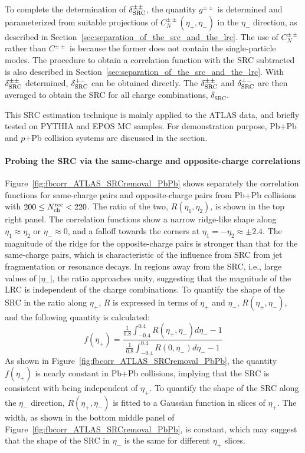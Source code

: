 To complete the determination of $\delta_\text{SRC}^{\pm\pm}$, the quantity $g^{\pm\pm}$ is determined and parameterized from suitable projections of $C_N^{\pm\pm}(\eta_+, \eta_-)$ in the $\eta_-$ direction, as described in Section~\ref{sec:separation_of_the_src_and_the_lrc}. The use of $C_N^{\pm\pm}$ rather than $C^{\pm\pm}$ is because the former does not contain the single-particle modes. The procedure to obtain a correlation function with the SRC subtracted is also described in Section~\ref{sec:separation_of_the_src_and_the_lrc}. With $\delta_\text{SRC}^{\pm\pm}$ determined, $\delta_\text{SRC}^{+-}$ can be obtained directly. The $\delta_\text{SRC}^{\pm\pm}$ and $\delta_\text{SRC}^{+-}$ are then averaged to obtain the SRC for all charge combinations, $\delta_\text{SRC}$.

This SRC estimation technique is mainly applied to the ATLAS data, and briefly tested on PYTHIA and EPOS MC samples. For demonstration purpose, Pb+Pb and $p$+Pb collision systems are discussed in the section.



\paragraph{Probing the SRC via the same-charge and opposite-charge correlations}
\label{sec:probing_the_src_via_the_same_charge_and_opposite_charge_correlations}

Figure~\ref{fig:fbcorr_ATLAS_SRCremoval_PbPb} shows separately the correlation functions for same-charge pairs and opposite-charge pairs from Pb+Pb collisions with $200 \le N_\text{ch}^\text{rec} < 220$. The ratio of the two, $R(\eta_1, \eta_2)$, is shown in the top right panel. The correlation functions show a narrow ridge-like shape along $\eta_1 \approx \eta_2$ or $\eta_- \approx 0$, and a falloff towards the corners at $\eta_1 = -\eta_2 \approx \pm 2.4$. The magnitude of the ridge for the opposite-charge pairs is stronger than that for the same-charge pairs, which is characteristic of the influence from SRC from jet fragmentation or resonance decays. In regions away from the SRC, i.e., large values of $|\eta_-|$, the ratio approaches unity, suggesting that the magnitude of the LRC is independent of the charge combinations. To quantify the shape of the SRC in the ratio along $\eta_+$, $R$ is expressed in terms of $\eta_+$ and $\eta_-$, $R(\eta_+, \eta_-)$, and the following quantity is calculated:
\begin{equation}
f(\eta_+) = \frac{\frac{1}{0.8} \int_{-0.4}^{0.4} R(\eta_+, \eta_-)d\eta_- - 1}{\frac{1}{0.8} \int_{-0.4}^{0.4} R(0, \eta_-)d\eta_- - 1}
\end{equation}
As shown in Figure~\ref{fig:fbcorr_ATLAS_SRCremoval_PbPb}, the quantity $f(\eta_+)$ is nearly constant in Pb+Pb collisions, implying that the SRC is consistent with being independent of $\eta_+$. To quantify the shape of the SRC along the $\eta_-$ direction, $R(\eta_+, \eta_-)$ is fitted to a Gaussian function in slices of $\eta_+$. The width, as shown in the bottom middle panel of Figure~\ref{fig:fbcorr_ATLAS_SRCremoval_PbPb}, is constant, which may suggest that the shape of the SRC in $\eta_-$ is the same for different $\eta_+$ slices.

